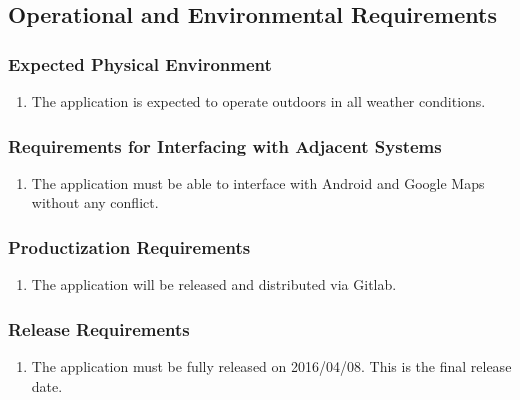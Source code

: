 \documentclass[]{article}
\begin{document}
\subsection{Operational and Environmental Requirements}
\label{sub:operational_and_environmental_requirements}

\cbstart
\subsubsection{Expected Physical Environment}
\label{ssub:expected_physical_environment}
\begin{enumerate}[{OE}1. ]
	\item The application is expected to operate outdoors in all weather conditions.
\end{enumerate}
\cbend

\subsubsection{Requirements for Interfacing with Adjacent Systems}
\label{ssub:requirements_for_interfacing_with_adjacent_systems}
\begin{enumerate}[{OE}2. ]
	\item The application must be able to interface with Android and Google Maps without any conflict.
\end{enumerate}

\cbstart
\subsubsection{Productization Requirements}
\label{ssub:productization_requirements}
\begin{enumerate}[{OE}3. ]
	\item The application will be released and distributed via Gitlab.
\end{enumerate}
\cbend

\cbstart
\subsubsection{Release Requirements}
\label{ssub:release_requirements}
\begin{enumerate}[{OE}4. ]
	\item The application must be fully released on 2016/04/08. This is the final release date.
\end{enumerate}
\cbend
\end{document}
